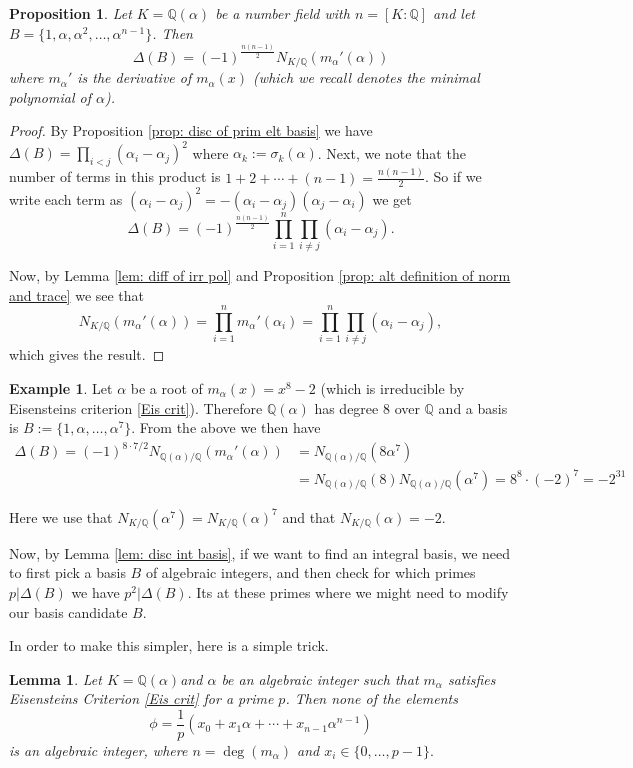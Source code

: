 \documentclass[11pt,a4paper]{report}
\theoremstyle{plain}
\newtheorem{lemma}[subsection]{Lemma}
\newtheorem{prop}[subsection]{Proposition}
\theoremstyle{definition}
\newtheorem{exmp}[subsection]{Example}
\theoremstyle{definition}
\def\QQ{\mathbb{Q}}
\def \a{\alpha}
\begin{document}
	
	\begin{prop}\label{prop: num field disc in terms of norm}
		Let $K=\QQ(\a)$ be a number field with $n=[K:\QQ]$ and let $B=\{1,\a,\a^2,\dots,\a^{n-1}\}$. Then \[\Delta(B)=(-1)^{\frac{n(n-1)}{2}}N_{K/\QQ}(m_\a'(\a))\] where $m_\a'$ is the derivative of $m_\a(x)$ (which we recall denotes the minimal polynomial of $\a$).
		
	\end{prop}
	\begin{proof}
		By Proposition \ref{prop: disc of prim elt basis} we have $\Delta(B)=\prod_{i < j}(\a_i-\a_j)^2$ where $\a_k:=\sigma_k(\a)$. Next, we note that the number of terms in this product is $1+2+\cdots+(n-1)=\frac{n(n-1)}{2}$. So if we write each term as $(\a_i-\a_j)^2=-(\a_i-\a_j)(\a_j-\a_i)$ we get \[\Delta(B)=(-1)^{\frac{n(n-1)}{2}}\prod_{i=1}^n \prod_{i \neq j} (\a_i-\a_j). \]
		
		Now, by Lemma \ref{lem: diff of irr pol} and Proposition \ref{prop: alt definition of norm and trace} we see that \[N_{K/\QQ}(m_\a'(\a))=\prod_{i=1}^n m_\a'(\a_i)=\prod_{i=1}^n \prod_{i \neq j} (\a_i-\a_j),\] which gives the result.
		
		
	\end{proof}
	
	\begin{exmp}\label{exmp: disc of x^8-2}
		Let $\a$ be a root of $m_\a(x)=x^8-2$ (which is irreducible by Eisensteins criterion \ref{Eis crit}). Therefore $\QQ(\a)$ has degree $8$ over $\QQ$ and a basis is $B:=\{1,\a,\dots,\a^7\}$. From the above we then have \begin{align*}\Delta(B)= (-1)^{8\cdot7/2} N_{\QQ(\a)/\QQ} (m_\a'(\a))&= N_{\QQ(\a)/\QQ} (8\a^7)\\&=N_{\QQ(\a)/\QQ}(8) N_{\QQ(\a)/\QQ}(\a^7)=8^8 \cdot (-2)^7=-2^{31}\end{align*}
		
		Here we use that $N_{K/\QQ}(\a^7)=N_{K/\QQ}(\a)^7$ and that $N_{K/\QQ}(\a)=-2$. 
	\end{exmp}
	
	Now, by Lemma \ref{lem: disc int basis}, if we want to find an integral basis, we need to first pick a basis $B$ of algebraic integers, and then check for which primes $p|\Delta(B)$ we have $p^2| \Delta(B)$. Its at these primes where we might need to modify our basis candidate $B$.
	
	In order to make this simpler, here is a simple trick.
	
	\begin{lemma}\label{lem: eis crit and alg ints}
		Let $K=\QQ(\a)$and $\a$ be an algebraic integer such that $m_\a$ satisfies Eisensteins Criterion \ref{Eis crit} for a prime $p$. Then none of the elements \[\phi=\frac{1}{p}(x_0+x_1\a+\cdots+x_{n-1}\a^{n-1})\] is an algebraic integer, where $n=\deg(m_\a)$ and $x_i \in \{0,\dots,p-1\}.$
	\end{lemma} 
	
\end{document}
